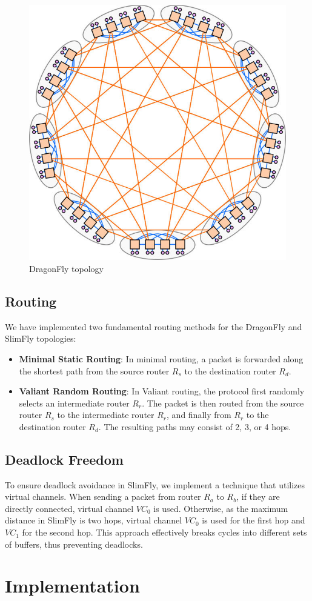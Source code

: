 \documentclass[utf8]{article}
\begin{document}
\begin{itemize}
    \begin{figure}[h]
        \centering
        \includegraphics[width=0.4\linewidth]{DragonFly.png}
        \caption{DragonFly topology}
    \end{figure}
\end{itemize}

\subsection{Routing}
We have implemented two fundamental routing methods for the DragonFly and SlimFly topologies:
\begin{itemize}
    \item \textbf{Minimal Static Routing}: In minimal routing, a packet is forwarded along the shortest path from the source router \(R_s\) to the destination router \(R_d\).
    \item \textbf{Valiant Random Routing}: In Valiant routing, the protocol first randomly selects an intermediate router \(R_r\). The packet is then routed from the source router \(R_s\) to the intermediate router \(R_r\), and finally from \(R_r\) to the destination router \(R_d\). The resulting paths may consist of 2, 3, or 4 hops.
\end{itemize}

\subsection{Deadlock Freedom}
To ensure deadlock avoidance in SlimFly, we implement a technique that utilizes virtual channels. When sending a packet from router \(R_a\) to \(R_b\), if they are directly connected, virtual channel \(VC_0\) is used. Otherwise, as the maximum distance in SlimFly is two hops, virtual channel \(VC_0\) is used for the first hop and \(VC_1\) for the second hop. This approach effectively breaks cycles into different sets of buffers, thus preventing deadlocks.

\section{Implementation}
\end{document}
